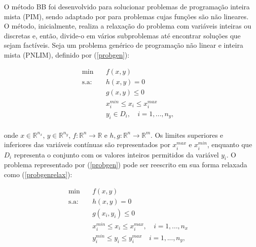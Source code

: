 \documentclass[
	12pt,				%
	openany,			%
	twoside,			%
	a4paper,			%
	chapter=TITLE,		%
	section=Title,		%
	subsection=Title,	%
	subsubsection=Title,%
	english,			%
	french,				%
	spanish,			%
	brazil			%
	]{abntex2}
\begin{document}
\begin{ERRATA}
O método BB foi desenvolvido para solucionar problemas de programação inteira mista (PIM), sendo adaptado por  para problemas cujas funções são não lineares. O método, inicialmente, realiza a relaxação do problema com variáveis inteiras ou discretas e, então, divide-o em vários subproblemas até encontrar soluções que sejam factíveis. Seja um problema genérico de programação não linear e inteira mista (PNLIM), definido por (\ref{probgen}):

\begin{equation} \label{probgen}
\begin{aligned}
\text{min}  & \quad f(x,y) \\
\text{s.a:} &\quad   h(x,y) = 0 \\
&\quad   g(x,y) \leq 0 \\
&\quad x^{min}_i \leq x_i \leq x^{max}_i\\
&\quad y_i \in D_i,\quad i=1,...,n_y ,\\
\end{aligned}
\end{equation}

\noindent onde $x \in \mathbb{R}^{n_x}$, $y \in \mathbb{R}^{n_y}$, $f: \mathbb{R}^n \rightarrow \mathbb{R}$ e $h,g: \mathbb{R}^n \rightarrow \mathbb{R}^m$. Os limites superiores e inferiores das variáveis contínuas são representados por $x^{max}_i$ e $x^{min}_i$, enquanto que $D_i$ representa o conjunto com os valores inteiros permitidos da variável $y_i$. O problema representado por (\ref{probgen}) pode ser reescrito em sua forma relaxada como (\ref{probgenrelax}):

\begin{equation} \label{probgenrelax}
\begin{aligned}
\text{min}  & \quad f(x,y) \\
\text{s.a:} &\quad   h(x,y) = 0 \\
&\quad   g(x_i,y_i) \leq 0 \\
&\quad x^{min}_i \leq x_i \leq x^{max}_i,\quad i=1,...,n_x\\
&\quad y^{min}_i \leq y_i \leq y^{max}_i \quad i=1,...,n_y ,\\
\end{aligned}
\end{equation}


\end{ERRATA}
\end{document}
